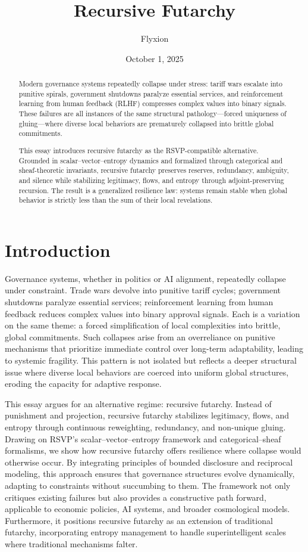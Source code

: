 \documentclass{article}
\title{Recursive Futarchy}
\author{Flyxion}
\date{October 1, 2025}
\begin{document}
\maketitle

\begin{abstract}
Modern governance systems repeatedly collapse under stress: tariff wars escalate into punitive spirals, government shutdowns paralyze essential services, and reinforcement learning from human feedback (RLHF) compresses complex values into binary signals. These failures are all instances of the same structural pathology—forced uniqueness of gluing—where diverse local behaviors are prematurely collapsed into brittle global commitments.

This essay introduces recursive futarchy as the RSVP-compatible alternative. Grounded in scalar–vector–entropy dynamics and formalized through categorical and sheaf-theoretic invariants, recursive futarchy preserves reserves, redundancy, ambiguity, and silence while stabilizing legitimacy, flows, and entropy through adjoint-preserving recursion. The result is a generalized resilience law: systems remain stable when global behavior is strictly less than the sum of their local revelations.
\end{abstract}

\section{Introduction}

Governance systems, whether in politics or AI alignment, repeatedly collapse under constraint. Trade wars devolve into punitive tariff cycles; government shutdowns paralyze essential services; reinforcement learning from human feedback reduces complex values into binary approval signals. Each is a variation on the same theme: a forced simplification of local complexities into brittle, global commitments. Such collapses arise from an overreliance on punitive mechanisms that prioritize immediate control over long-term adaptability, leading to systemic fragility. This pattern is not isolated but reflects a deeper structural issue where diverse local behaviors are coerced into uniform global structures, eroding the capacity for adaptive response.

This essay argues for an alternative regime: recursive futarchy. Instead of punishment and projection, recursive futarchy stabilizes legitimacy, flows, and entropy through continuous reweighting, redundancy, and non-unique gluing. Drawing on RSVP’s scalar–vector–entropy framework and categorical–sheaf formalisms, we show how recursive futarchy offers resilience where collapse would otherwise occur. By integrating principles of bounded disclosure and reciprocal modeling, this approach ensures that governance structures evolve dynamically, adapting to constraints without succumbing to them. The framework not only critiques existing failures but also provides a constructive path forward, applicable to economic policies, AI systems, and broader cosmological models. Furthermore, it positions recursive futarchy as an extension of traditional futarchy, incorporating entropy management to handle superintelligent scales where traditional mechanisms falter.
\end{document}
